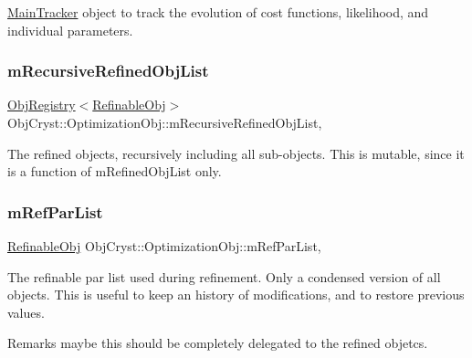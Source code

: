 \mbox{\hyperlink{class_obj_cryst_1_1_main_tracker}{Main\+Tracker}} object to track the evolution of cost functions, likelihood, and individual parameters. \mbox{\label{class_obj_cryst_1_1_optimization_obj_a0e6a9e9d4d12ed73c582da36190f110f}} 
\subsubsection{\texorpdfstring{mRecursiveRefinedObjList}{mRecursiveRefinedObjList}}
{\footnotesize\ttfamily \mbox{\hyperlink{class_obj_cryst_1_1_obj_registry}{Obj\+Registry}}$<$\mbox{\hyperlink{class_obj_cryst_1_1_refinable_obj}{Refinable\+Obj}}$>$ Obj\+Cryst\+::\+Optimization\+Obj\+::m\+Recursive\+Refined\+Obj\+List\hspace{0.3cm}{\ttfamily [mutable]}, {\ttfamily [protected]}}

The refined objects, recursively including all sub-\/objects. This is mutable, since it is a function of m\+Refined\+Obj\+List only. \mbox{\label{class_obj_cryst_1_1_optimization_obj_a9cf13c38f24b4b2ddd6cb239286053af}} 
\subsubsection{\texorpdfstring{mRefParList}{mRefParList}}
{\footnotesize\ttfamily \mbox{\hyperlink{class_obj_cryst_1_1_refinable_obj}{Refinable\+Obj}} Obj\+Cryst\+::\+Optimization\+Obj\+::m\+Ref\+Par\+List\hspace{0.3cm}{\ttfamily [mutable]}, {\ttfamily [protected]}}

The refinable par list used during refinement. Only a condensed version of all objects. This is useful to keep an history of modifications, and to restore previous values. \begin{DoxyRemark}{Remarks}
maybe this should be completely delegated to the refined objetcs. 
\end{DoxyRemark}
\mbox{\label{class_obj_cryst_1_1_optimization_obj_a1b33baa71f4e0b182bae66766608425f}} 
